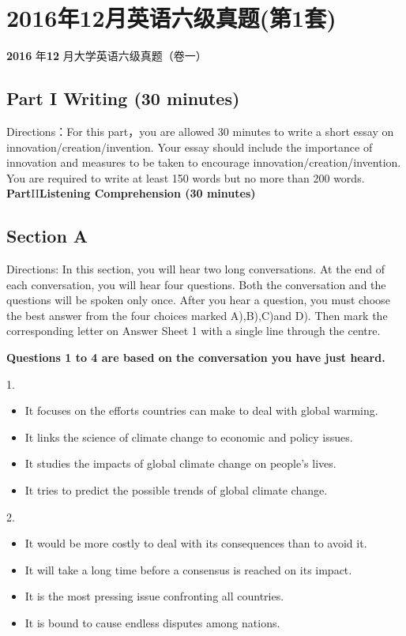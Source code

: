 \documentclass[UTF8,11pt]{ctexart}
\begin{document}
\section*{2016年12月英语六级真题(第1套)}
\textbf{2016} 年\textbf{12} 月大学英语六级真题（卷一）


\subsection*{\textbf{Part I Writing (30 minutes)}}


Directions：For this part，you are allowed 30 minutes to write a short essay on innovation/creation/invention. Your essay should include the importance of innovation and measures to be taken to encourage innovation/creation/invention. You are required to write at least 150 words but no more than 200 words. \textbf{Part}II\textbf{Listening Comprehension (30 minutes)}


\subsection*{\textbf{Section A}}


Directions: In this section, you will hear two long conversations. At the end of each conversation, you will hear four questions. Both the conversation and the questions will be spoken only once. After you hear a question, you must choose the best answer from the four choices marked A),B),C)and D). Then mark the corresponding letter on Answer Sheet 1 with a single line through the centre.


\textbf{Questions 1 to 4 are based on the conversation you have just heard.}


1.


\begin{itemize}[leftmargin=2em,itemsep=.2em,topsep=.4em]\item[A.] It focuses on the efforts countries can make to deal with global warming.
\item[B.] It links the science of climate change to economic and policy issues.
\item[C.] It studies the impacts of global climate change on people’s lives.
\item[D.] It tries to predict the possible trends of global climate change.
\end{itemize}

2.


\begin{itemize}[leftmargin=2em,itemsep=.2em,topsep=.4em]\item[A.] It would be more costly to deal with its consequences than to avoid it.
\item[B.] It will take a long time before a consensus is reached on its impact.
\item[C.] It is the most pressing issue confronting all countries.
\item[D.] It is bound to cause endless disputes among nations.
\end{itemize}
\end{document}
